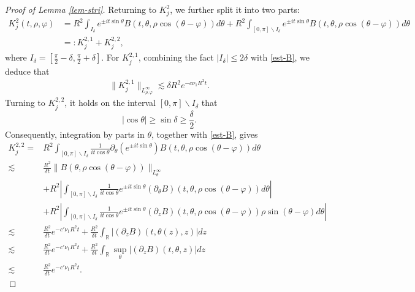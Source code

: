 \documentclass[12pt]{article}
\numberwithin{equation}{section}
\begin{document}
\begin{proof}[Proof of Lemma \ref{lem-stri}]
    Returning to $K^2_j$, we further split it into two parts:
  	\begin{align*}
  		K^{2}_j(t,\rho,\varphi)&=R^2\int_{I_{\delta}}e^{\pm it\sin\theta}B(t,\theta,\rho\cos(\theta-\varphi))d\theta+R^2\int_{[0,\pi]\backslash I_{\delta}}e^{\pm it\sin\theta}B(t,\theta,\rho\cos(\theta-\varphi))d\theta\\
  		&=:K^{2,1}_j+K^{2,2}_j,
  	\end{align*}
  	where $I_{\delta}=[\frac{\pi}{2}-\delta,\frac{\pi}{2}+\delta]$.
  	For $K^{2,1}_j$, 
  	combining the fact $|I_{\delta}|\leq 2\delta$ with \eqref{est-B}, we deduce that
  	\begin{align*}
  		\|K^{2,1}_j\|_{L^\infty_{\rho,\varphi}}\lesssim \delta R^2 e^{-c\nu_1 R^2 t}.
  	\end{align*}
    Turning to $K^{2,2}_j$, it holds on the interval $[0,\pi]\backslash I_{\delta}$ that
  	\begin{equation}\label{est-g}
  		|\cos\theta|\geq \sin\delta\geq\frac{\delta}{2}.
  	\end{equation}
  	Consequently, integration by parts in $\theta$, together with \eqref{est-B}, gives
  	\begin{align*}
  		K^{2,2}_j=&R^2\int_{[0,\pi]\backslash I_{\delta}}\frac{1}{it\cos\theta}\partial_{\theta}\left(e^{\pm it\sin\theta}\right)B(t,\theta,\rho\cos(\theta-\varphi))d\theta\\
  		\lesssim&\frac{R^2}{\delta t}	\|B(\theta,\rho\cos(\theta-\varphi))\|_{L^\infty_{\theta}}\\
  		&+R^2\left| \int_{[0,\pi]\backslash I_{\delta}}\frac{1}{it\cos\theta}e^{\pm it\sin\theta}(\partial_{\theta}B)(t,\theta,\rho\cos(\theta-\varphi))d\theta\right|\\
        &+R^2\left| \int_{[0,\pi]\backslash I_{\delta}}\frac{1}{it\cos\theta}e^{\pm it\sin\theta}(\partial_{z}B)(t,\theta,\rho\cos(\theta-\varphi))\rho\sin(\theta-\varphi)d\theta\right|\\
        \lesssim &\frac{R^2}{\delta t}e^{-c'\nu_1 R^2 t}+\frac{R^2}{\delta t}\int_{\mathbb{R}}|(\partial_zB)(t,\theta(z),z)|dz\\
  		\lesssim &\frac{R^2}{\delta t}e^{-c'\nu_1 R^2 t}+\frac{R^2}{\delta t}\int_{\mathbb{R}}\sup_{\theta}|(\partial_zB)(t,\theta,z)|dz\\
  		\lesssim &\frac{R^2}{\delta t}e^{-c'\nu_1 R^2 t}.
  	\end{align*}

\end{proof}
\end{document}
